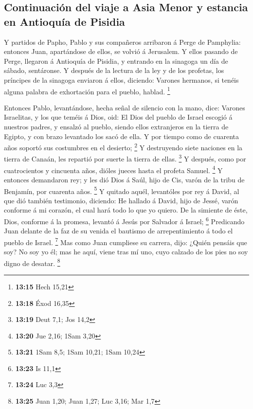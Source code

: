 \hypertarget{continuaciuxf3n-del-viaje-a-asia-menor-y-estancia-en-antioquuxeda-de-pisidia}{%
\subsection{Continuación del viaje a Asia Menor y estancia en Antioquía
de
Pisidia}\label{continuaciuxf3n-del-viaje-a-asia-menor-y-estancia-en-antioquuxeda-de-pisidia}}

 Y partidos de Papho, Pablo y sus compañeros arribaron á
Perge de Pamphylia: entonces Juan, apartándose de ellos, se volvió á
Jerusalem.  Y ellos pasando de Perge, llegaron á Antioquía
de Pisidia, y entrando en la sinagoga un día de sábado, sentáronse.
 Y después de la lectura de la ley y de los profetas, los
príncipes de la sinagoga enviaron á ellos, diciendo: Varones hermanos,
si tenéis alguna palabra de exhortación para el pueblo, hablad.
\footnote{\textbf{13:15} Hech 15,21}

 Entonces Pablo, levantándose, hecha señal de silencio con
la mano, dice: Varones Israelitas, y los que teméis á Dios, oid:
 El Dios del pueblo de Israel escogió á nuestros padres, y
ensalzó al pueblo, siendo ellos extranjeros en la tierra de Egipto, y
con brazo levantado los sacó de ella.  Y por tiempo como de
cuarenta años soportó sus costumbres en el desierto; \footnote{\textbf{13:18}
  Éxod 16,35}  Y destruyendo siete naciones en la tierra de
Canaán, les repartió por suerte la tierra de ellas. \footnote{\textbf{13:19}
  Deut 7,1; Jos 14,2}  Y después, como por cuatrocientos y
cincuenta años, dióles jueces hasta el profeta Samuel. \footnote{\textbf{13:20}
  Jue 2,16; 1Sam 3,20}  Y entonces demandaron rey; y les
dió Dios á Saúl, hijo de Cis, varón de la tribu de Benjamín, por
cuarenta años. \footnote{\textbf{13:21} 1Sam 8,5; 1Sam 10,21; 1Sam 10,24}
 Y quitado aquél, levantóles por rey á David, al que dió
también testimonio, diciendo: He hallado á David, hijo de Jessé, varón
conforme á mi corazón, el cual hará todo lo que yo quiero. 
De la simiente de éste, Dios, conforme á la promesa, levantó á Jesús por
Salvador á Israel; \footnote{\textbf{13:23} Is 11,1} 
Predicando Juan delante de la faz de su venida el bautismo de
arrepentimiento á todo el pueblo de Israel. \footnote{\textbf{13:24} Luc
  3,3}  Mas como Juan cumpliese su carrera, dijo: ¿Quién
pensáis que soy? No soy yo él; mas he aquí, viene tras mí uno, cuyo
calzado de los pies no soy digno de desatar. \footnote{\textbf{13:25}
  Juan 1,20; Juan 1,27; Luc 3,16; Mar 1,7}

